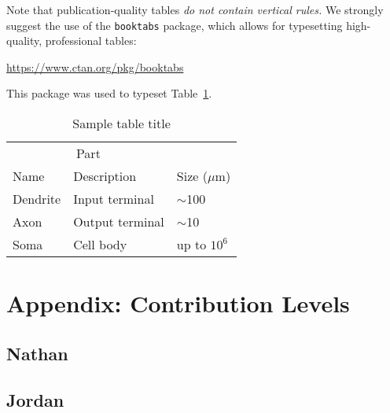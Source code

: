 \documentclass{article}
\begin{document}
Note that publication-quality tables \emph{do not contain vertical
  rules.} We strongly suggest the use of the \verb+booktabs+ package,
which allows for typesetting high-quality, professional tables:
\begin{center}
    \url{https://www.ctan.org/pkg/booktabs}
\end{center}
This package was used to typeset Table~\ref{sample-table}.

\begin{table}[t]
    \caption{Sample table title}
    \label{sample-table}
    \centering
    \begin{tabular}{lll}
        \toprule
        \multicolumn{2}{c}{Part}                   \\
        \cmidrule{1-2}
        Name     & Description     & Size ($\mu$m) \\
        \midrule
        Dendrite & Input terminal  & $\sim$100     \\
        Axon     & Output terminal & $\sim$10      \\
        Soma     & Cell body       & up to $10^6$  \\
        \bottomrule
    \end{tabular}
\end{table}

\section*{Appendix: Contribution Levels}

\subsection*{Nathan}

\subsection*{Jordan}
\end{document}
